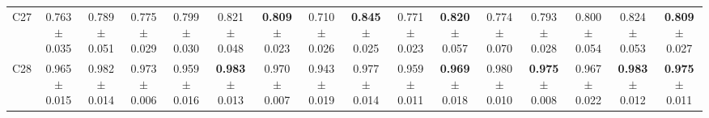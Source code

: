 \begin{table}
{\begin{tabular}{lccccccccccccccc}
C27 & 0.763 $\pm$ 0.035 & 0.789 $\pm$ 0.051 & 0.775 $\pm$ 0.029 & 0.799 $\pm$ 0.030 & 0.821 $\pm$ 0.048 & \textbf{0.809} $\pm$ 0.023 & 0.710 $\pm$ 0.026 & \textbf{0.845} $\pm$ 0.025 & 0.771 $\pm$ 0.023 & \textbf{0.820} $\pm$ 0.057 & 0.774 $\pm$ 0.070 & 0.793 $\pm$ 0.028 & 0.800 $\pm$ 0.054 & 0.824 $\pm$ 0.053 & \textbf{0.809} $\pm$ 0.027 \\
C28 & 0.965 $\pm$ 0.015 & 0.982 $\pm$ 0.014 & 0.973 $\pm$ 0.006 & 0.959 $\pm$ 0.016 & \textbf{0.983} $\pm$ 0.013 & 0.970 $\pm$ 0.007 & 0.943 $\pm$ 0.019 & 0.977 $\pm$ 0.014 & 0.959 $\pm$ 0.011 & \textbf{0.969} $\pm$ 0.018 & 0.980 $\pm$ 0.010 & \textbf{0.975} $\pm$ 0.008 & 0.967 $\pm$ 0.022 & \textbf{0.983} $\pm$ 0.012 & \textbf{0.975} $\pm$ 0.011 \\
\bottomrule
\end{tabular}%
}
\end{table}